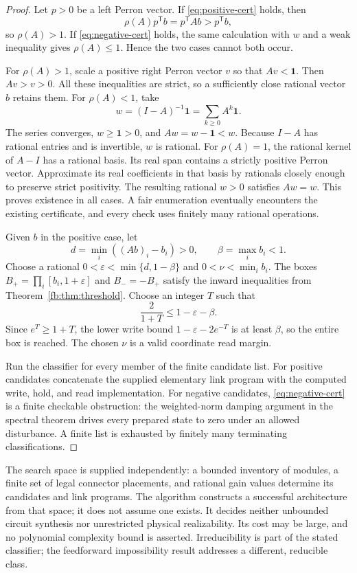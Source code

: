 \documentclass[11pt]{article}
\theoremstyle{definition}
\theoremstyle{remark}
\begin{document}
\begin{proof}
Let $p>0$ be a left Perron vector. If \eqref{eq:positive-cert} holds, then
\[
 \rho(A)p^{\mathsf T}b=p^{\mathsf T}Ab>p^{\mathsf T}b,
\]
so $\rho(A)>1$. If \eqref{eq:negative-cert} holds, the same calculation
with $w$ and a weak inequality gives $\rho(A)\leq1$. Hence the two cases
cannot both occur.

For $\rho(A)>1$, scale a positive right Perron vector $v$ so that
$Av<\boldsymbol1$. Then $Av>v>0$. All these inequalities are strict,
so a sufficiently close rational vector $b$ retains them. For
$\rho(A)<1$, take
\[
          w=(I-A)^{-1}\boldsymbol1
           =\sum_{k\geq0}A^k\boldsymbol1.
\]
The series converges, $w\geq\boldsymbol1>0$, and $Aw=w-\boldsymbol1<w$.
Because $I-A$ has rational entries and is invertible, $w$ is rational.
For $\rho(A)=1$, the rational kernel of $A-I$ has a rational basis.
Its real span contains a strictly positive Perron vector. Approximate
its real coefficients in that basis by rationals closely enough to
preserve strict positivity. The resulting rational $w>0$ satisfies
$Aw=w$. This proves existence in all cases. A fair enumeration eventually
encounters the existing certificate, and every check uses finitely many
rational operations.

Given $b$ in the positive case, let
\[
 d=\min_i((Ab)_i-b_i)>0,\qquad \beta=\max_i b_i<1.
\]
Choose a rational $0<\varepsilon<\min\{d,1-\beta\}$ and
$0<\nu<\min_i b_i$. The boxes
$B_+=\prod_i[b_i,1+\varepsilon]$ and $B_-=-B_+$ satisfy the inward
inequalities from Theorem~\ref{fb:thm:threshold}. Choose an integer $T$
such that
\[
                 \frac{2}{1+T}\leq1-\varepsilon-\beta.
\]
Since $e^T\geq1+T$, the lower write bound
$1-\varepsilon-2e^{-T}$ is at least $\beta$, so the entire box is
reached. The chosen $\nu$ is a valid coordinate read margin.

Run the classifier for every member of the finite candidate list. For
positive candidates concatenate the supplied elementary link program with
the computed write, hold, and read implementation. For negative
candidates, \eqref{eq:negative-cert} is a finite checkable obstruction:
the weighted-norm damping argument in the spectral theorem drives every
prepared state to zero under an allowed disturbance. A finite list is
exhausted by finitely many terminating classifications.
\end{proof}

The search space is supplied independently: a bounded inventory of
modules, a finite set of legal connector placements, and rational gain
values determine its candidates and link programs. The algorithm constructs
a successful architecture from that space; it does not assume one exists.
It decides neither unbounded circuit synthesis nor unrestricted physical
realizability. Its cost may be large, and no polynomial complexity bound
is asserted. Irreducibility is part of the stated classifier; the
feedforward impossibility result addresses a different, reducible class.
\end{document}
